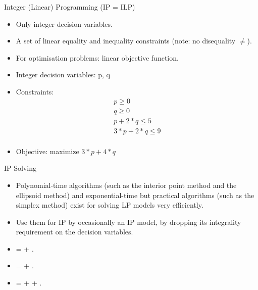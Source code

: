 \documentclass{cons-beamer}
\begin{document}
\begin{frame}[fragile]{Integer (Linear) Programming (IP = ILP)}
  \begin{itemize}
    \item Only integer decision variables.
    \item A set of linear equality and inequality constraints (note: no
      disequality $\neq$).
    \item For optimisation problems: linear objective function.
  \end{itemize}
  \vfill
  \begin{example}
    \begin{itemize}
      \item Integer decision variables: p, q
      \item Constraints:
        \vspace{-2mm}
        {\footnotesize
        \begin{align*}
          p \geq 0 \\
          q \geq 0 \\
          p + 2 * q \leq 5 \\
          3 * p + 2 * q \leq 9 \\
        \end{align*}}
        \vspace{-6mm}
      \item Objective: maximize $3 * p + 4 * q$
    \end{itemize}
  \end{example}
\end{frame}

\begin{frame}{IP Solving}
  \begin{itemize}
    \item Polynomial-time algorithms (such as the interior point method and the
      ellipsoid method) and exponential-time but practical algorithms
      (such as the simplex method) exist for solving LP models very
      efficiently.
    \item Use them for IP by occasionally  an IP
      model, by dropping its integrality requirement on the decision
      variables.
  \end{itemize}
  \vfill

  \begin{itemize}
    \item {} =  +
      .
    \item {} =  +
      .
    \item {} =  +
       + .
  \end{itemize}
\end{frame}
\end{document}
